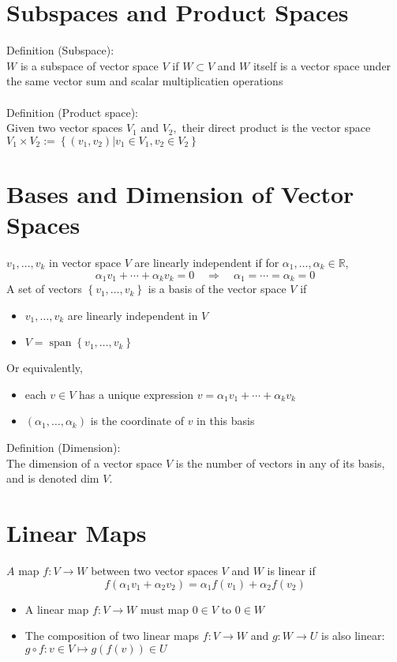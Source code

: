 \documentclass[10pt,a4paper,oneside]{article}
\begin{document}
\section{Subspaces and Product Spaces}
Definition (Subspace):
\\$W$ is a subspace of vector space $V$ if $W \subset V$ and $W$ itself is a vector
space under the same vector sum and scalar multiplicatien operations
\\
\\Definition (Product space):
\\Given two vector spaces $V_{1}$ and $V_{2},$ their direct product is the vector
space $V_{1} \times V_{2} :=\left\{\left(v_{1}, v_{2}\right) | v_{1} \in V_{1}, v_{2} \in V_{2}\right\}$
\section{Bases and Dimension of Vector Spaces}
$v_{1}, \ldots, v_{k}$ in vector space $V$ are linearly independent if for $\alpha_{1}, \ldots, \alpha_{k} \in \mathbb{R}$,
\[
\alpha_{1} v_{1}+\cdots+\alpha_{k} v_{k}=0 \quad \Rightarrow \quad \alpha_{1}=\cdots=\alpha_{k}=0
\]
A set of vectors $\left\{v_{1}, \ldots, v_{k}\right\}$ is a basis of the vector space $V$ if
\begin{itemize}
\item $v_{1}, \ldots, v_{k}$ are linearly independent in $V$
\item $V=\operatorname{span}\left\{v_{1}, \ldots, v_{k}\right\}$
\end{itemize}
Or equivalently,
\begin{itemize}
\item each $v \in V$ has a unique expression $v=\alpha_{1} v_{1}+\cdots+\alpha_{k} v_{k}$
\item $\left(\alpha_{1}, \ldots, \alpha_{k}\right)$ is the coordinate of $v$ in this basis
\end{itemize}
Definition (Dimension):
\\The dimension of a vector space $V$ is the number of vectors in any of its
basis, and is denoted dim $V$.
\section{Linear Maps}
$A$ map $f : V \rightarrow W$ between two vector spaces $V$ and $W$ is linear if
\[
f\left(\alpha_{1} v_{1}+\alpha_{2} v_{2}\right)=\alpha_{1} f\left(v_{1}\right)+\alpha_{2} f\left(v_{2}\right)
\]
\begin{itemize}
\item A linear map $f : V \rightarrow W$ must map $0 \in V$ to $0\in W$
\item The composition of two linear maps $f:V\rightarrow W$ and $g:W\rightarrow U$ is also linear: $g \circ f : v \in V \mapsto g(f(v)) \in U$
\end{itemize}
\end{document}
